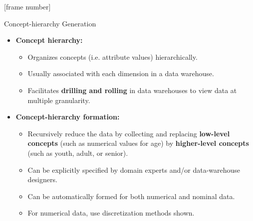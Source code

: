 \documentclass[aspectratio=169,t]{beamer}
\begin{document}
  {
    [frame number]
    \begin{frame}{Concept-hierarchy Generation}
        \begin{itemize}
            \item \textbf{Concept hierarchy:}
            \begin{itemize}
              \item Organizes concepts (i.e. attribute values) hierarchically.
              \item Usually associated with each dimension in a data warehouse.
              \item Facilitates \textbf{drilling and rolling} in data warehouses to view data at multiple granularity.
            \end{itemize}
            \item \textbf{Concept-hierarchy formation:}
            \begin{itemize}
              \item Recursively reduce the data by collecting and replacing \textbf{low-level concepts} (such as numerical values for age) by \textbf{higher-level concepts} (such as youth, adult, or senior).
              \item Can be explicitly specified by domain experts and/or data-warehouse designers.
              \item Can be automatically formed for both numerical and nominal data.
              \item For numerical data, use discretization methods shown.
            \end{itemize}
        \end{itemize}
    \end{frame}
  }
\end{document}
